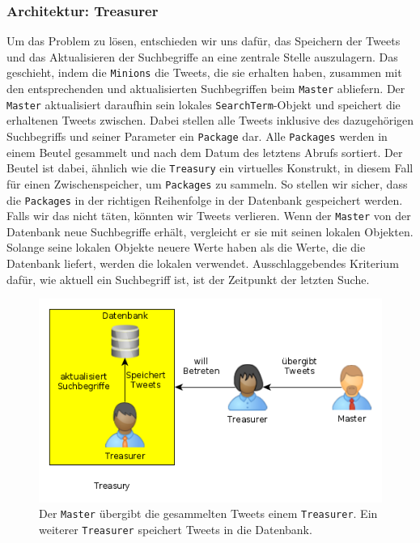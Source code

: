 \subsubsection{Architektur: Treasurer}%
Um das Problem zu lösen, entschieden wir uns dafür, das Speichern der Tweets und das Aktualisieren der Suchbegriffe an eine zentrale Stelle auszulagern.
Das geschieht, indem die \texttt{Minions} die Tweets, die sie erhalten haben, zusammen mit den entsprechenden und aktualisierten Suchbegriffen beim \texttt{Master} abliefern.
Der \texttt{Master} aktualisiert daraufhin sein lokales \texttt{SearchTerm}-Objekt und speichert die erhaltenen Tweets zwischen.
Dabei stellen alle Tweets inklusive des dazugehörigen Suchbegriffs und seiner Parameter ein \texttt{Package} dar.
Alle \texttt{Packages} werden in einem Beutel gesammelt und nach dem Datum des letztens Abrufs sortiert.
Der Beutel ist dabei, ähnlich wie die \texttt{Treasury} ein virtuelles Konstrukt, in diesem Fall für einen Zwischenspeicher, um \texttt{Packages} zu sammeln.
So stellen wir sicher, dass die \texttt{Packages} in der richtigen Reihenfolge in der Datenbank gespeichert werden.
Falls wir das nicht täten, könnten wir Tweets verlieren.
Wenn der \texttt{Master} von der Datenbank neue Suchbegriffe erhält, vergleicht er sie mit seinen lokalen Objekten.
Solange seine lokalen Objekte neuere Werte haben als die Werte, die die Datenbank liefert, werden die lokalen verwendet.
Ausschlaggebendes Kriterium dafür, wie aktuell ein Suchbegriff ist, ist der Zeitpunkt der letzten Suche.

\begin{figure}[ht]
\includegraphics[width=\textwidth]{Bilder/Daemon/DaemonArchitektur2.png}
\caption{Der \texttt{Master} übergibt die gesammelten Tweets einem \texttt{Treasurer}. Ein weiterer \texttt{Treasurer} speichert Tweets in die Datenbank.}
\label{img:daemonarchitektur2}
\end{figure}

